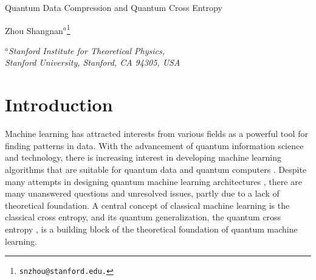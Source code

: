 \documentclass[11pt]{article}
\renewcommand{\title}[1]{\vbox{\center\LARGE{#1}}\vspace{5mm}}
\newcommand{\address}[1]{\vbox{\center\em#1}}
\begin{document}
\title{Quantum Data Compression and Quantum Cross Entropy} 
\begin{center}
\vspace{5mm}
Zhou Shangnan$^{a}$\footnote{\tt snzhou@stanford.edu.}
\end{center}

\address{${}^a$Stanford Institute for Theoretical Physics, \\
Stanford University, Stanford, CA 94305, USA}




\begin{abstract}
Quantum machine learning is an emerging field at the intersection of machine learning and quantum computing. A central quantity for the theoretical foundation of quantum machine learning is the quantum cross entropy. 
In this paper, we present one operational interpretation of this quantity, that the quantum cross entropy is the compression rate for sub-optimal quantum source coding. To do so, we give a simple, universal quantum data compression protocol, which is developed based on quantum generalization of variable-length coding, as well as quantum strong typicality. Moreover, since data compression can be viewed as a machine learning task, quantum cross entropy also serves as a loss function, whose minimum is the von Neumann entropy. This is consistent with the result that von Neumann entropy is the optimal compression rate.
\end{abstract}

\section{Introduction}

Machine learning has attracted interests from various fields as a powerful tool for finding patterns in data. With the advancement of quantum information science and technology, there is increasing interest in developing machine learning algorithms that are suitable for quantum data and quantum computers \cite{QMLNature}. Despite many attempts in designing quantum machine learning architectures \cite{KernelNature, KernelPRL, Barren, deepqnn}, there are many unanswered questions and unresolved issues, partly due to a lack of theoretical foundation. A central concept of classical machine learning is the classical cross entropy, and its quantum generalization, the quantum cross entropy \cite{max}, is a building block of the theoretical foundation of quantum machine learning.
\end{document}
